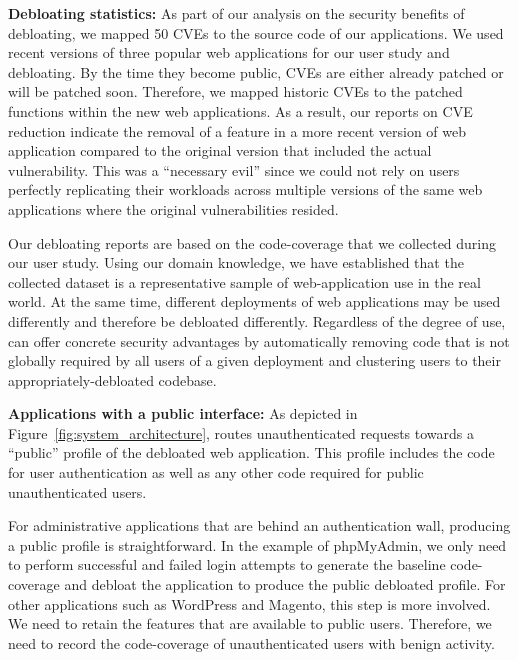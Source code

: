 
\noindent\textbf{Debloating statistics: }
As part of our analysis on the security benefits of debloating, we mapped 50 CVEs to the source code of our applications. 
We used recent versions of three popular web applications for our user study and debloating.
By the time they become public, CVEs are either already patched or will be patched soon. 
Therefore, we mapped historic CVEs to the patched functions within the new web applications. 
As a result, our reports on CVE reduction indicate the removal of a feature in a more recent version of web application compared to the original version that included the actual vulnerability. This was a ``necessary evil'' since we could not rely on users perfectly replicating their workloads across multiple versions of the same web applications where the original vulnerabilities resided.

Our debloating reports are based on the code-coverage that we collected during our user study. Using our domain knowledge, we have established that the collected dataset is a representative sample of web-application use in the real world. At the same time, different deployments of web applications may be used differently and therefore be debloated differently. Regardless of the degree of use, \dbltr{} can offer concrete security advantages by automatically removing code that is not globally required by all users of a given deployment and clustering users to their appropriately-debloated codebase.


\noindent\textbf{Applications with a public interface: }
As depicted in Figure~\ref{fig:system_architecture}, \dbltr{} routes unauthenticated requests towards a ``public'' profile of the debloated web application. 
This profile includes the code for user authentication as well as any other code required for public unauthenticated users. 

For administrative applications that are behind an authentication wall, producing a public profile is straightforward. 
In the example of phpMyAdmin, we only need to perform successful and failed login attempts to generate the baseline code-coverage and debloat the application to produce the public debloated profile. 
For other applications such as WordPress and Magento, this step is more involved. 
We need to retain the features that are available to public users. 
Therefore, we need to record the code-coverage of unauthenticated users with benign activity. 

